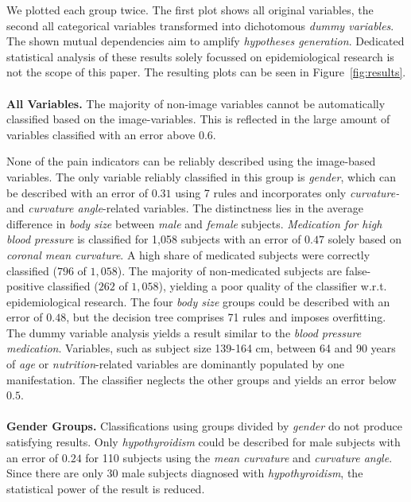 \documentclass[a4paper,twoside]{style/article}
\begin{document}
We plotted each group twice.
The first plot shows all original variables, the second all categorical variables transformed into dichotomous \emph{dummy variables}.
The shown mutual dependencies aim to amplify \emph{hypotheses generation}.
Dedicated statistical analysis of these results solely focussed on epidemiological research is not the scope of this paper.
The resulting plots can be seen in Figure~\ref{fig:results}.
\\\\
\noindent \textbf{All Variables.}
The majority of non-image variables cannot be automatically classified based on the image-variables.
This is reflected in the large amount of variables classified with an error above $0.6$.

None of the pain indicators can be reliably described using the image-based variables.
The only variable reliably classified in this group is \emph{gender}, which can be described with an error of $0.31$ using 7 rules and incorporates only \emph{curvature-} and \emph{curvature angle}-related variables.
The distinctness lies in the average difference in \emph{body size} between \emph{male} and \emph{female} subjects.
\emph{Medication for high blood pressure} is classified for 1,058 subjects with an error of $0.47$ solely based on \emph{coronal mean curvature}.
A high share of medicated subjects were correctly classified ($796$ of $1,058$).
The majority of non-medicated subjects are false-positive classified ($262$ of $1,058$), yielding a poor quality of the classifier w.r.t. epidemiological research.
The four \emph{body size} groups could be described with an error of $0.48$, but the decision tree comprises 71 rules and imposes overfitting.
The dummy variable analysis yields a result similar to the \emph{blood pressure medication}.
Variables, such as subject size 139-164 cm, between 64 and 90 years of \emph{age} or \emph{nutrition}-related variables are dominantly populated by one manifestation.
The classifier neglects the other groups and yields an error below $0.5$.
\\\\
\noindent \textbf{Gender Groups.}
Classifications using groups divided by \emph{gender} do not produce satisfying results.
Only \emph{hypothyroidism} could be described for male subjects with an error of $0.24$ for 110 subjects using the \emph{mean curvature} and \emph{curvature angle}.
Since there are only 30 male subjects diagnosed with \emph{hypothyroidism}, the statistical power of the result is reduced.
\end{document}
